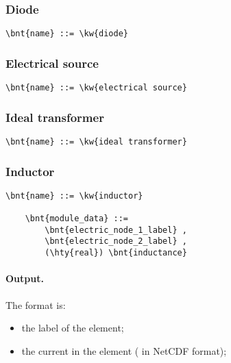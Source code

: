 \subsubsection{Diode}
\begin{Verbatim}[commandchars=\\\{\}]
    \bnt{name} ::= \kw{diode}
\end{Verbatim}


\subsubsection{Electrical source}
\begin{Verbatim}[commandchars=\\\{\}]
    \bnt{name} ::= \kw{electrical source}
\end{Verbatim}


\subsubsection{Ideal transformer}
\begin{Verbatim}[commandchars=\\\{\}]
    \bnt{name} ::= \kw{ideal transformer}
\end{Verbatim}


\subsubsection{Inductor}
\begin{Verbatim}[commandchars=\\\{\}]
    \bnt{name} ::= \kw{inductor}

    \bnt{module_data} ::=
        \bnt{electric_node_1_label} ,
        \bnt{electric_node_2_label} ,
        (\hty{real}) \bnt{inductance}
\end{Verbatim}

\paragraph{Output.}
\label{sec:MODULE:FAB-ELECTRIC:INDUCTOR:OUTPUT}
The format is:
\begin{itemize}
\item the label of the element;
\item the current in the element ( in NetCDF format);
\end{itemize}


